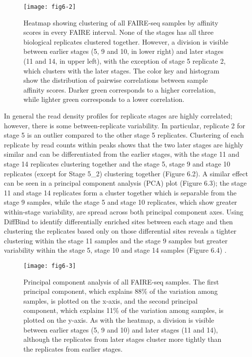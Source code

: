 \begin{figure}
\centering
\texttt{[image: fig6-2]}
\caption{Heatmap showing clustering of all FAIRE-seq samples by affinity scores in every FAIRE interval. None of the stages has all three biological replicates clustered together. However, a division is visible between earlier stages (5, 9 and 10, in lower right) and later stages (11 and 14, in upper left), with the exception of stage 5 replicate 2, which clusters with the later stages. The color key and histogram show the distribution of pairwise correlations between sample affinity scores. Darker green corresponds to a higher correlation, while lighter green corresponds to a lower correlation.}
\label{Figure 6.2}
\end{figure}

In general the read density profiles for replicate stages are highly correlated; however, there is some between-replicate variability. In particular, replicate 2 for stage 5 is an outlier compared to the other stage 5 replicates. Clustering of each replicate by read counts within peaks shows that the two later stages are highly similar and can be differentiated from the earlier stages, with the stage 11 and stage 14 replicates clustering together and the stage 5, stage 9 and stage 10 replicates (except for Stage 5\_2) clustering together (Figure 6.2). A similar effect can be seen in a principal component analysis (PCA) plot (Figure 6.3); the stage 11 and stage 14 replicates form a cluster together which is separable from the stage 9 samples, while the stage 5 and stage 10 replicates, which show greater within-stage variability, are spread across both principal component axes. Using DiffBind to identify differentially enriched sites between each stage and then clustering the replicates based only on those differential sites reveals a tighter clustering within the stage 11 samples and the stage 9 samples but greater variability within the stage 5, stage 10 and stage 14 samples (Figure 6.4) \citep{ross-innes_differential_2012-1}.\\

\begin{figure}
\centering
\texttt{[image: fig6-3]}
\caption{Principal component analysis of all FAIRE-seq samples. The first principal component, which explains 88\% of the variation among samples, is plotted on the x-axis, and the second principal component, which explains 11\% of the variation among samples, is plotted on the y-axis. As with the heatmap, a division is visible between earlier stages (5, 9 and 10) and later stages (11 and 14), although the replicates from later stages cluster more tightly than the replicates from earlier stages.}
\label{Figure 6.3}
\end{figure}

